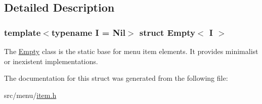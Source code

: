 \subsection{Detailed Description}
\subsubsection*{template$<$typename I = Nil$>$\newline
struct Empty$<$ I $>$}

The \hyperlink{structEmpty}{Empty} class is the static base for menu item elements. It provides minimalist or inexistent implementations. 

The documentation for this struct was generated from the following file\+:\begin{DoxyCompactItemize}
\item 
src/menu/\hyperlink{item_8h}{item.\+h}\end{DoxyCompactItemize}
